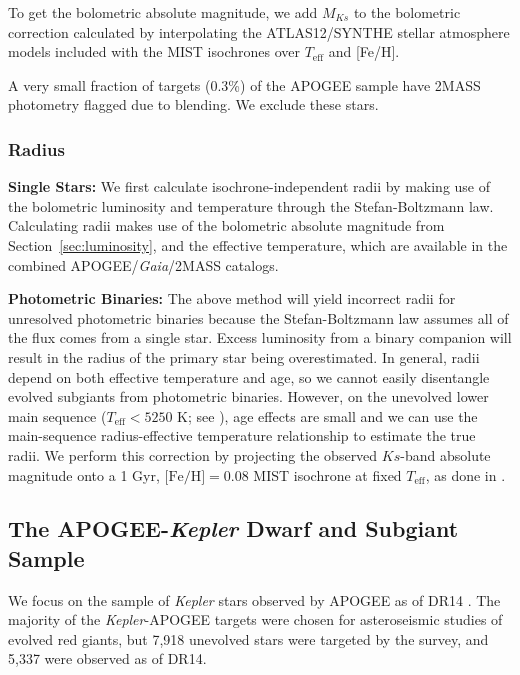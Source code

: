 \documentclass[preprint2]{aastex62}
\newcommand{\Kepler}{\mbox{\textit{Kepler}}}
\newcommand{\Gaia}{\mbox{\textit{Gaia}}}
\newcommand{\Teff}{\ensuremath{T_{\textrm{eff}}}}
\newcommand{\Ks}{\ensuremath{Ks}}
\newcommand{\MK}{\ensuremath{M_{\Ks}}}
\newcommand{\feh}{\textrm{[Fe/H]}}
\begin{document}
To get the bolometric absolute magnitude, 
we add \MK{} to the bolometric correction calculated by interpolating the ATLAS12/SYNTHE 
\citet{Kurucz70, Kurucz93} stellar atmosphere models included with the MIST
isochrones over \Teff{} and \feh{}. 

A very small fraction of targets (0.3\%) of the 
APOGEE sample have 2MASS photometry flagged due to blending. We exclude these
stars. 

\subsubsection{Radius}
\label{sec:radius}

\textbf{Single Stars:} We first calculate isochrone-independent 
radii by making use of the bolometric luminosity and temperature through the 
Stefan-Boltzmann law. Calculating radii makes use of the bolometric absolute 
magnitude from Section~\ref{sec:luminosity}, and the effective temperature, 
which are available in the combined APOGEE/\Gaia{}/2MASS catalogs. 

\textbf{Photometric Binaries:} The above method will yield incorrect radii 
for unresolved photometric binaries because the Stefan-Boltzmann law assumes all of the flux comes 
from a single star. Excess luminosity from a binary companion will result in the radius of the primary star being overestimated. In general, radii depend on both effective temperature and age, so we cannot easily disentangle evolved subgiants from photometric binaries. However, on the unevolved lower main sequence (\(\Teff < 5250 \textrm{ K}\); see
\citealt{Simonian19}), age effects are small and we can use the main-sequence radius-effective temperature relationship to estimate the true radii. We perform this correction by projecting the
observed \Ks-band absolute magnitude onto a 1 Gyr, \(\feh=0.08\) MIST isochrone 
at fixed \Teff{}, as done in \citet{Simonian19}.

\subsection{The APOGEE-\Kepler{} Dwarf and Subgiant Sample}
\label{sec:sample}




We focus on the sample of \Kepler{} stars observed by APOGEE as of DR14
\citep{Zasowski17}. The majority of the \Kepler-APOGEE
targets were chosen for asteroseismic studies of evolved red giants, but 7,918 
unevolved stars were targeted by the survey, and 5,337 were observed as of DR14. 
\end{document}
